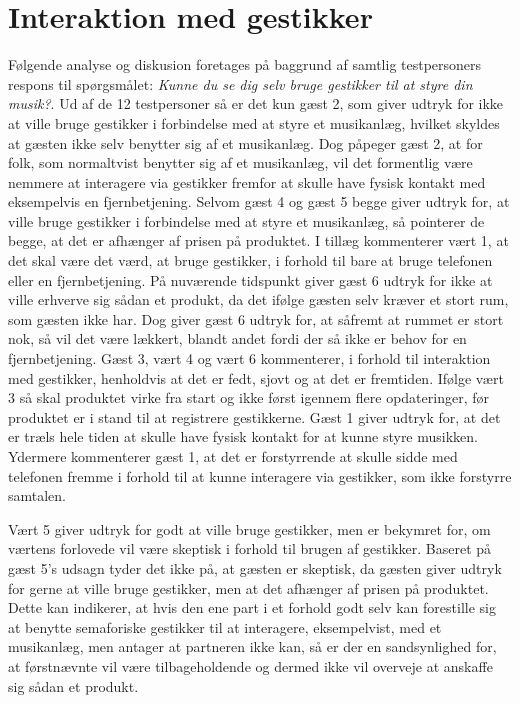 \section{Interaktion med gestikker}
\label{TestresultaterSocialAcceptBrug}
%
Følgende analyse og diskusion foretages på baggrund af samtlig testpersoners respons til spørgsmålet: \textit{Kunne du se dig selv bruge gestikker til at styre din musik?}. \blankline
%
Ud af de 12 testpersoner så er det kun gæst 2, som giver udtryk for ikke at ville bruge gestikker i forbindelse med at styre et musikanlæg, hvilket skyldes at gæsten ikke selv benytter sig af et musikanlæg. Dog påpeger gæst 2, at for folk, som normaltvist benytter sig af et musikanlæg, vil det formentlig være nemmere at interagere via gestikker fremfor at skulle have fysisk kontakt med eksempelvis en fjernbetjening. Selvom gæst 4 og gæst 5 begge giver udtryk for, at ville bruge gestikker i forbindelse med at styre et musikanlæg, så pointerer de begge, at det er afhænger af prisen på produktet. I tillæg kommenterer vært 1, at det skal være det værd, at bruge gestikker, i forhold til bare at bruge telefonen eller en fjernbetjening. På nuværende tidspunkt giver gæst 6 udtryk for ikke at ville erhverve sig sådan et produkt, da det ifølge gæsten selv kræver et stort rum, som gæsten ikke har. Dog giver gæst 6 udtryk for, at såfremt at rummet er stort nok, så vil det være lækkert, blandt andet fordi der så ikke er behov for en fjernbetjening. Gæst 3, vært 4 og vært 6 kommenterer, i forhold til interaktion med gestikker, henholdvis at det er fedt, sjovt og at det er fremtiden. Ifølge vært 3 så skal produktet virke fra start og ikke først igennem flere opdateringer, før produktet er i stand til at registrere gestikkerne. Gæst 1 giver udtryk for, at det er træls hele tiden at skulle have fysisk kontakt for at kunne styre musikken. Ydermere kommenterer gæst 1, at det er forstyrrende at skulle sidde med telefonen fremme i forhold til at kunne interagere via gestikker, som ikke forstyrre samtalen.

Vært 5 giver udtryk for godt at ville bruge gestikker, men er bekymret for, om værtens forlovede vil være skeptisk i forhold til brugen af gestikker. Baseret på gæst 5's udsagn tyder det ikke på, at gæsten er skeptisk, da gæsten giver udtryk for gerne at ville bruge gestikker, men at det afhænger af prisen på produktet. Dette kan indikerer, at hvis den ene part i et forhold godt selv kan forestille sig at benytte semaforiske gestikker til at interagere, eksempelvist, med et musikanlæg, men antager at partneren ikke kan, så er der en sandsynlighed for, at førstnævnte vil være tilbageholdende og dermed ikke vil overveje at anskaffe sig sådan et produkt.    

